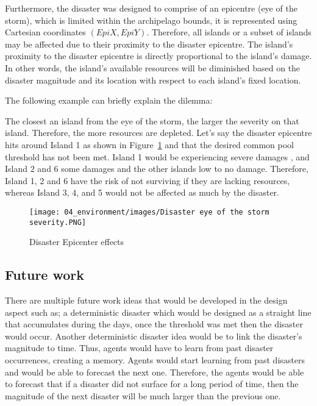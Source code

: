 Furthermore, the disaster was designed to comprise of an epicentre (eye of the storm), which is limited within the archipelago bounds, it is represented using Cartesian coordinates $(EpiX, EpiY)$. Therefore, all islands or a subset of islands may be affected due to their proximity to the disaster epicentre. The island’s proximity to the disaster epicentre is directly proportional to the island’s damage. In other words, the island's available resources will be diminished based on the disaster magnitude and its location with respect to each island’s fixed location.

The following example can briefly explain the dilemma:

The closest an island from the eye of the storm, the larger the severity on that island. Therefore, the more resources are depleted. Let’s say the disaster epicentre hits around Island 1 as shown in Figure~\ref{fig:Disaster eye of the storm severity} and that the desired common pool threshold has not been met. Island 1 would be experiencing severe damages , and Island 2 and 6 some damages and the other islands low to no damage. Therefore, Island 1, 2 and 6 have the risk of not surviving if they are lacking resources, whereas Island 3, 4, and 5 would not be affected as much by the disaster.

\begin{figure}[!htb]
    \centering
    \texttt{[image: 04\_environment/images/Disaster eye of the storm severity.PNG]}
    \caption{Disaster Epicenter effects}
    \label{fig:Disaster eye of the storm severity}
\end{figure}

\newpage
\subsection{Future work}

There are multiple future work ideas that would be developed in the design aspect such as; a deterministic disaster which would be  designed as a straight line that accumulates during the days, once the threshold was met then the disaster would occur. Another deterministic disaster idea would be to link the disaster’s magnitude to time. Thus, agents would have to learn from past disaster occurrences, creating a memory. Agents would start learning from past disasters and would be able to forecast the next one. Therefore, the agents would be able to forecast that if a disaster did not surface for a long period of time, then the magnitude of the next disaster will be much larger than the previous one.

